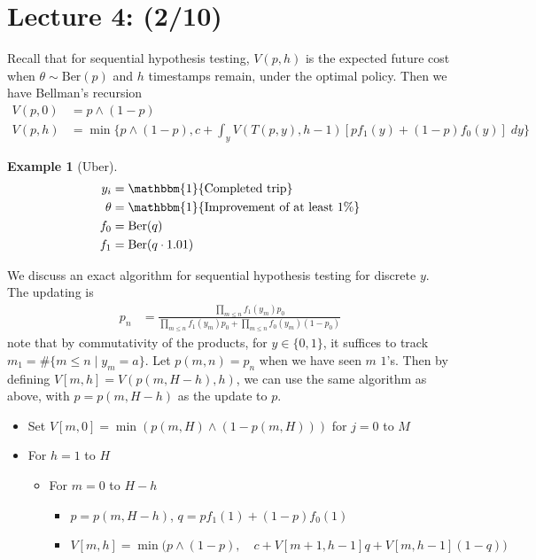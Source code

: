 \documentclass[pdftex,letterpaper,11pt]{article}
\theoremstyle{definition}
\newtheorem{example}{Example}[section]
\theoremstyle{definition}
\theoremstyle{definition}
\newcommand{\ind}{\mathbbm{1}}
\newcommand{\mrm}[1]{\mathrm{#1}}
\begin{document}
\section*{Lecture 4: (2/10)}

Recall that for sequential hypothesis testing, $V(p,h)$ is the expected future cost when $\theta \sim \mrm{Ber}(p)$ and $h$ timestamps remain, under the optimal policy. Then we have Bellman's recursion
\begin{align*}
	V(p,0) & = p \wedge (1-p)\\
	V(p,h) & = \min\big \{p \wedge (1-p), c + \int_y V(T(p,y), h-1)[pf_1(y) + (1-p)f_0(y)]\; dy \big \}
\end{align*}

\begin{example}[Uber]
	\begin{align*}
		y_i & = \ind\{\mbox{Completed trip} \}\\
		\theta & = \ind\{\mbox{Improvement of at least $1$\%} \}\\
		f_0 & = \mrm{Ber}(q)\\
		f_1 & = \mrm{Ber}(q\cdot 1.01)
	\end{align*}
\end{example}

We discuss an exact algorithm for sequential hypothesis testing for discrete $y$. The updating is
\begin{align*}
	p_n & = \frac{\prod_{m \leq n}f_1(y_m) p_0}{\prod_{m \leq n} f_1(y_m)p_0 + \prod_{m \leq n} f_0(y_m) (1-p_0)}
\end{align*}
note that by commutativity of the products, for $y \in \{0,1\}$, it suffices to track $m_1 = \#\{m \leq n \mid y_m = a\}$. Let $p(m,n) = p_n$ when we have seen $m$ $1$'s. Then by defining $V[m,h] = V(p(m, H-h), h)$, we can use the same algorithm as above, with $p = p(m,H-h)$ as the update to $p$.

\begin{itemize}
	\item[] Set $V[m, 0] = \min(p(m,H) \wedge (1-p(m,H)))$ for $j=0$ to $M$
	\item[] For $h=1$ to $H$
		\begin{itemize}
			\item[] For $m=0$ to $H-h$
				\begin{itemize}
					\item[] $p=p(m, H-h)$, $q = pf_1(1) + (1-p)f_0(1)$
					\item[] $V[m,h] = \min\big(p \wedge (1-p),\quad c + V[m+1, h-1]q + V[m, h-1](1-q) \big)$
				\end{itemize}
		\end{itemize}
\end{itemize}
\end{document}
